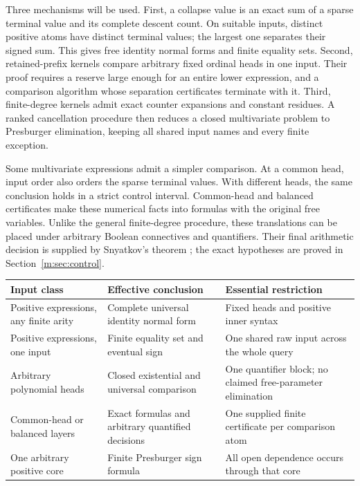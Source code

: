 \documentclass[11pt,a4paper]{article}
\theoremstyle{definition}
\theoremstyle{remark}
\numberwithin{equation}{section}
\begin{document}
Three mechanisms will be used.  First, a collapse value is an exact sum
of a sparse terminal value and its complete descent count.  On suitable
inputs, distinct positive atoms have distinct terminal values; the largest
one separates their signed sum.  This gives free identity normal forms
and finite equality sets.  Second, retained-prefix kernels compare
arbitrary fixed ordinal heads in one input.  Their proof requires a
reserve large enough for an entire lower expression, and a comparison
algorithm whose separation certificates terminate with it.  Third,
finite-degree kernels admit exact counter expansions and constant
residues.  A ranked cancellation procedure then reduces a closed
multivariate problem to Presburger elimination, keeping all shared input
names and every finite exception.

Some multivariate expressions admit a simpler comparison.  At a common
head, input order also orders the sparse terminal values.  With different
heads, the same conclusion holds in a strict control interval.
Common-head and balanced certificates make these numerical facts into
formulas with the original free variables.  Unlike the general
finite-degree procedure, these translations can be placed under arbitrary
Boolean connectives and quantifiers.  Their final arithmetic decision is
supplied by Snyatkov's theorem \cite{snyatkov}; the exact hypotheses are
proved in Section~\ref{m:sec:control}.

\begin{center}
\small
\begin{tabularx}{\textwidth}{@{}>{\raggedright\arraybackslash}p{}
 >{\raggedright\arraybackslash}X>{\raggedright\arraybackslash}X@{}}
\toprule
Input class & Effective conclusion & Essential restriction\\
\midrule
Positive expressions, any finite arity
& Complete universal identity normal form
& Fixed heads and positive inner syntax\\
Positive expressions, one input
& Finite equality set and eventual sign
& One shared raw input across the whole query\\
Arbitrary polynomial heads
& Closed existential and universal comparison
& One quantifier block; no claimed free-parameter elimination\\
Common-head or balanced layers
& Exact formulas and arbitrary quantified decisions
& One supplied finite certificate per comparison atom\\
One arbitrary positive core
& Finite Presburger sign formula
& All open dependence occurs through that core\\
\bottomrule
\end{tabularx}
\end{center}
\end{document}
